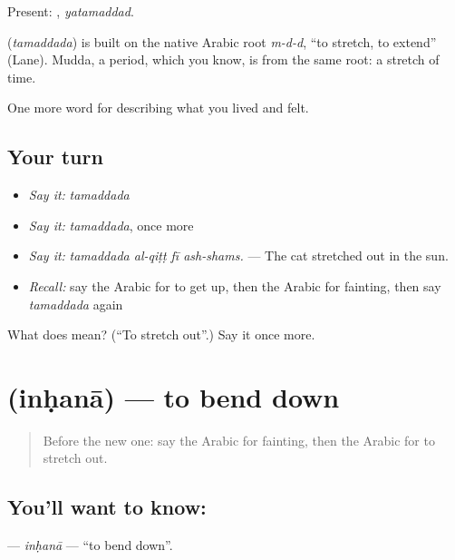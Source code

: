 Present: , \emph{yatamaddad}.

\begin{cousinweb}
\textbf{} (\emph{tamaddada}) is built on the native Arabic root \emph{m-d-d}, \textquotedblleft{}to stretch, to extend\textquotedblright{} (Lane). Mudda, a period, which you know, is from the same root: a stretch of time.
\end{cousinweb}

\begin{grammarlens}[title={What you've built}]
One more word for describing what you lived and felt.
\end{grammarlens}

\subsection*{Your turn}
\begin{itemize}
\raggedright
  \item \emph{Say it:} \emph{tamaddada}
  \item \emph{Say it:} \emph{tamaddada}, once more
  \item \emph{Say it:} \emph{tamaddada al-qiṭṭ fī ash-shams.} — The cat stretched out in the sun.
  \item \emph{Recall:} say the Arabic for to get up, then the Arabic for fainting, then say \emph{tamaddada} again
\end{itemize}

\begin{tcolorbox}[breakable,colback=teal!4,colframe=teal!35!black,title={Before you move on}]
What does  mean? (\textquotedblleft{}To stretch out\textquotedblright{}.) Say it once more.
\end{tcolorbox}
\section[\texorpdfstring{\ar{انحنى} (inḥanā)}{انحنى (inḥanā)}]{ (inḥanā) — to bend down}

\label{lesson:AR-C516-inhana}



\begin{quote}
Before the new one: say the Arabic for fainting, then the Arabic for to stretch out.
\end{quote}

\subsection*{You'll want to know: }
\textbf{} — \emph{inḥanā} — \textquotedblleft{}to bend down\textquotedblright{}.

